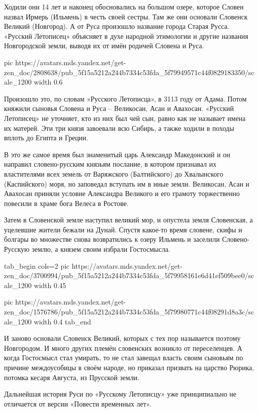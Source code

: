 Ходили они 14 лет и наконец обосновались на большом озере, которое Словен
назвал Ирмерь (Ильмень) в честь своей сестры. Там же они основали Словенск
Великий (Новгород). А от Руса произошло название города Старая Русса. «Русский
Летописец» объясняет в духе народной этимологии и другие названия Новгородской
земли, выводя их от имён родичей Словена и Руса.


\ifcmt
  pic https://avatars.mds.yandex.net/get-zen_doc/2808638/pub_5f15a5212a244b7334c53fda_5f79949571c44f0829183350/scale_1200
	width 0.6
\fi

Произошло это, по словам «Русского Летописца», в 3113 году от Адама. Потом
княжили сыновья Словена и Руса – Великосан, Асан и Авахосан. «Русский
Летописец» не уточняет, кто из них был чей сын, равно как не называет имена их
матерей. Эти три князя завоевали всю Сибирь, а также ходили в походы вплоть до
Египта и Греции.

В это же самое время был знаменитый царь Александр Македонский и он направил
словено-русским князьям послание, в котором признавал их властителями всех
земель от Варяжского (Балтийского) до Хвалынского (Каспийского) моря, но
заповедал вступать им в иные земли. Великосан, Асан и Авахосан приняли условие
Александра Великого и его грамоту торжественно повесили в храме бога Велеса в
Ростове.

Затем в Словенской земле наступил великий мор, и опустела земля Словенская, а
уцелевшие жители бежали на Дунай. Спустя какое-то время словене, скифы и
болгары во множестве снова возвратились к озеру Ильмень и заселили
Словено-Русскую землю, а князем своим избрали Гостосмысла. 


\ifcmt
tab_begin cols=2
  pic https://avatars.mds.yandex.net/get-zen_doc/3700994/pub_5f15a5212a244b7334c53fda_5f79958161e6d41ef509bee0/scale_1200
	width 0.45

  pic https://avatars.mds.yandex.net/get-zen_doc/1576786/pub_5f15a5212a244b7334c53fda_5f79980771c44f08291d8a3c/scale_1200
	width 0.4
tab_end
\fi

И заново основали Словенск Великий, которых с тех пор называется поэтому
Новгородом. И много других племён словенских возникло от переселенцев. А когда
Гостосмысл стал умирать, то не стал завещал власть своим сыновьям по причине
междоусобицы в своём народе, но приказал призвать на царство Рюрика, потомка
кесаря Августа, из Прусской земли.

Дальнейшая история Руси по «Русскому Летописцу» уже принципиально не отличается
от версии «Повести временных лет».

